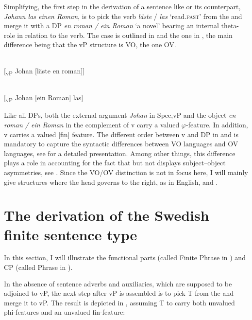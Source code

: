 \documentclass[output=paper]{LSP/langsci}
\begin{document}
Simplifying, the first step in the derivation of a sentence like   or its  counterpart, \textit{Johann las einen Roman},
is to pick the verb \textit{läste} / \textit{las} ‘read.\textsc{past}’ from the  and merge it with a DP \textit{en roman / ein Roman} ‘a novel’ bearing an internal theta-role in relation to the verb. The  case is outlined in  and the  one in , the main difference being that the  vP structure is VO, the  one OV. 

\ea%
    \label{ex:platzack:12}
 
	   \\{}
    [\textsubscript{vP} Johan  [läste en roman]]
\z

\ea%
    \label{ex:platzack:13}
	  \\{}
    [\textsubscript{vP} Johan  [ein Roman] las]
\z

Like all DPs, both the external argument \textit{Johan} in Spec,vP and the object \textit{en roman / ein Roman} in the complement of v carry a valued $\varphi $-feature. In addition, v carries a valued [fin] feature. The different order between v and DP in  and  is mandatory to capture the syntactic differences between VO languages and OV languages, see \citet[5--43]{Haider2010} for a detailed presentation. Among other things, this difference plays a role in accounting for the fact that  but not  displays subject–object asymmetries, see \citet[79ff]{Haider2010}. Since the VO/OV distinction is not in focus here, I will mainly give structures where the head governs to the right, as in English,  and .

\section{The derivation of the Swedish finite sentence type}\label{sec:platzack:3}

In this section, I will illustrate the functional parts  (called Finite Phrase in \citealt{Rizzi1997}) and CP (called  Phrase in \citealt{Rizzi1997}).   

  In the absence of sentence adverbs and auxiliaries, which are supposed to be adjoined to vP, the next step after vP is assembled is to pick T from the  and merge it to vP. The result is depicted in , assuming T to carry both unvalued phi-features and an unvalued fin-feature: 
\end{document}
